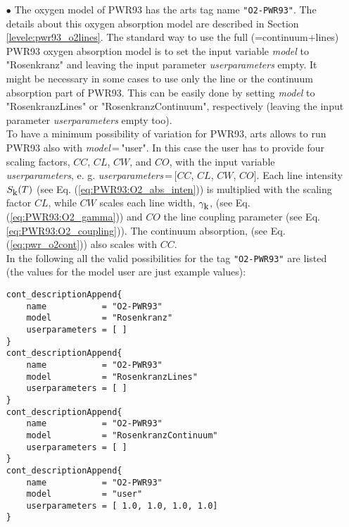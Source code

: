 {\begin{itemize}
\item[$\bullet$] The oxygen model of PWR93 \citep{pwr:93}
     has the arts tag name {\tt "O2-PWR93"}. The details about this 
     oxygen absorption model are described in Section \ref{levele:pwr93_o2lines}. 
     The standard way to use the full (=continuum+lines) PWR93 oxygen 
     absorption model is to set the input variable {\it model} 
     to "Rosenkranz" and leaving the input parameter {\it userparameters} empty. 
     It might be necessary in some cases to use only the line or the 
     continuum absorption part of PWR93. This can be easily done 
     by setting {\it model} to "RosenkranzLines" or "RosenkranzContinuum", 
     respectively (leaving the input parameter {\it userparameters} 
     empty too).\\ To have a minimum possibility of variation for PWR93, 
     arts allows to run PWR93 also with {\it model}\,=\,"user". 
     In this case the user has to provide four scaling factors,  
     $CC$, $CL$, $CW$, and $CO$, with the input variable {\it userparameters}, 
     e. g. {\it userparameters}\,=\,$[$$CC$, $CL$, $CW$, $CO$$]$. 
     Each line intensity $S_{\mbox{\rm \small k}}(T)$ (see Eq. (\ref{eq:PWR93:O2_abs_inten})) 
     is multiplied with the scaling factor $CL$, while $CW$ scales 
     each line width, $\gamma_{\mbox{\rm \small k}}$, (see Eq. (\ref{eq:PWR93:O2_gamma})) and 
     $CO$ the line coupling parameter (see Eq. \ref{eq:PWR93:O2_coupling})). 
     The continuum absorption, (see Eq. (\ref{eq:pwr_o2cont})) 
     also scales with $CC$.\\
     In the following all the valid possibilities for the
     tag {\tt "O2-PWR93"} are listed (the values for the 
     model user are just example values):
\begin{verbatim}
cont_descriptionAppend{
    name           = "O2-PWR93"
    model          = "Rosenkranz"
    userparameters = [ ]
}
cont_descriptionAppend{
    name           = "O2-PWR93"
    model          = "RosenkranzLines"
    userparameters = [ ]
}
cont_descriptionAppend{
    name           = "O2-PWR93"
    model          = "RosenkranzContinuum"
    userparameters = [ ]
}
cont_descriptionAppend{
    name           = "O2-PWR93"
    model          = "user"
    userparameters = [ 1.0, 1.0, 1.0, 1.0]
}
\end{verbatim}
\end{itemize}

}
